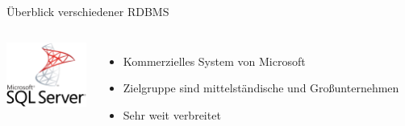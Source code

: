 \documentclass[18pt]{beamer}
\begin{document}
\begin{frame}{Überblick verschiedener RDBMS}
\begin{columns}
	\includegraphics[width=0.99\textwidth]{images/sqlserver} 
  \begin{itemize}
  \item Kommerzielles System von Microsoft 
  \item Zielgruppe sind mittelständische und Großunternehmen
  \item Sehr weit verbreitet
  \end{itemize}
\end{columns}
\end{frame}
\end{document}
